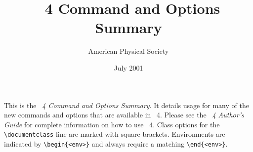 \documentclass[twocolumn,secnumarabic,amssymb, amsmath, nofootinbib,tightenlines,
nobibnotes, aps, prl]{revtex4}
\begin{document}
\title[Command Option Summary]{\revtex~4 Command and Options Summary}%

\author{American Physical Society}%
\date{July 2001}%
\maketitle

This is the \textit{\revtex~4 Command and Options Summary}. It details
usage for many of the new commands and options that are available in
\revtex~4. Please see the \textit{\revtex~4 Author's Guide} for
complete information on how to use \revtex~4.  Class options for the
\verb+\documentclass+ line are marked with square
brackets. Environments are indicated by \verb+\begin{<env>}+ and always
require a matching \verb+\end{<env>}+.
\end{document}
